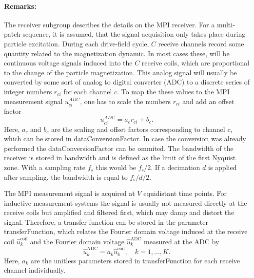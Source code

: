 \documentclass[landscape,a4paper]{article} %
\newcommand{\inlvar}[1]{{\ttfamily#1}}
\begin{document}
\begin{multicols}{2}
	\paragraph{Remarks:} The receiver subgroup describes the details on the MPI receiver. For a multi-patch sequence, it is assumed, that the signal acquisition only takes place during particle excitation. During each drive-field cycle, $C$ receive channels record some quantity related to the magnetization dynamic. In most cases these, will be continuous voltage signals induced into the $C$ receive coils, which are proportional to the change of the particle magnetization. This analog signal will usually be converted by some sort of analog to digital converter (ADC) to a discrete series of integer numbers $r_{ci}$ for each channel $c$. To map the these values to the MPI measurement signal $u_{ci}^{ADC}$, one has to scale the numbers $r_{ci}$ and add an offset factor
\begin{equation*}
	u_{ci}^{ADC} = a_c r_{ci} +b_c.
\end{equation*}
Here, $a_c$ and $b_c$ are the scaling and offset factors corresponding to channel $c$, which can be stored in \inlvar{dataConversionFactor}. In case the conversion was already performed the \inlvar{dataConversionFactor} can be ommited. The bandwidth of the receiver is stored in \inlvar{bandwidth} and is defined as the limit of the first Nyquist zone. With a sampling rate $f_s$ this would be $f_\text{s}/2$. If a decimation $d$ is applied after sampling, the bandwidth is equal to $f_\text{s}/d/2$.

The MPI measurement signal is acquired at $V$ equidistant time points. For inductive measurement systems the signal is usually not measured directly at the receive coils but amplified and filtered first, which may damp and distort the signal. Therefore, a transfer function can be stored in the parameter \inlvar{transferFunction}, which relates the Fourier domain voltage induced at the receive coil $\hat{u}_k^\text{coil}$ and the Fourier domain voltage $\hat{u}_k^\text{ADC}$ measured at the ADC by
\begin{equation*}
\hat{u}_k^\text{ADC} = a_k  \hat{u}_k^\text{coil}, \quad k=1,\dots,K.
\end{equation*}
Here, $a_k$ are the unitless parameters stored in \inlvar{transferFunction} for each receive channel individually. 


\end{multicols}
\end{document}
